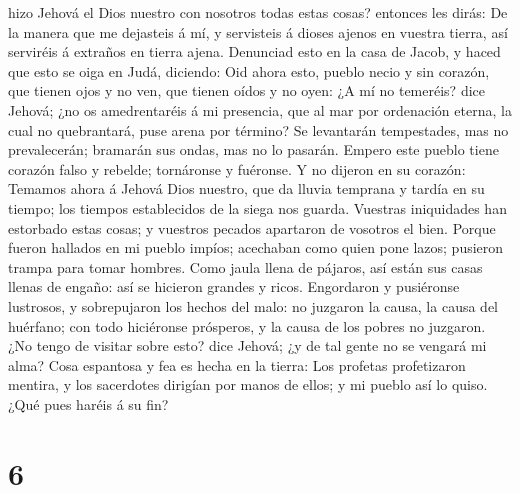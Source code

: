 hizo Jehová el Dios nuestro con nosotros todas estas cosas? entonces les
dirás: De la manera que me dejasteis á mí, y servisteis á dioses ajenos
en vuestra tierra, así serviréis á extraños en tierra ajena.
 Denunciad esto en la casa de Jacob, y haced que esto se
oiga en Judá, diciendo:  Oid ahora esto, pueblo necio y sin
corazón, que tienen ojos y no ven, que tienen oídos y no oyen:
 ¿A mí no temeréis? dice Jehová; ¿no os amedrentaréis á mi
presencia, que al mar por ordenación eterna, la cual no quebrantará,
puse arena por término? Se levantarán tempestades, mas no prevalecerán;
bramarán sus ondas, mas no lo pasarán.  Empero este pueblo
tiene corazón falso y rebelde; tornáronse y fuéronse.  Y no
dijeron en su corazón: Temamos ahora á Jehová Dios nuestro, que da
lluvia temprana y tardía en su tiempo; los tiempos establecidos de la
siega nos guarda.  Vuestras iniquidades han estorbado estas
cosas; y vuestros pecados apartaron de vosotros el bien. 
Porque fueron hallados en mi pueblo impíos; acechaban como quien pone
lazos; pusieron trampa para tomar hombres.  Como jaula
llena de pájaros, así están sus casas llenas de engaño: así se hicieron
grandes y ricos.  Engordaron y pusiéronse lustrosos, y
sobrepujaron los hechos del malo: no juzgaron la causa, la causa del
huérfano; con todo hiciéronse prósperos, y la causa de los pobres no
juzgaron.  ¿No tengo de visitar sobre esto? dice Jehová; ¿y
de tal gente no se vengará mi alma?  Cosa espantosa y fea
es hecha en la tierra:  Los profetas profetizaron mentira,
y los sacerdotes dirigían por manos de ellos; y mi pueblo así lo quiso.
¿Qué pues haréis á su fin?

\hypertarget{section-5}{%
\section{6}\label{section-5}}

